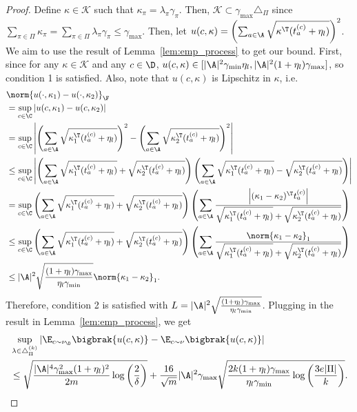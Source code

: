 \documentclass{article}
\newcommand{\mc}[1]{\mathcal{#1}}
\newcommand{\1}{\mathbf{1}}
\begin{document}
\begin{proof}
Define $\kappa\in\mc{K}$ such that $\kappa_\pi=\lambda_\pi\gamma_\pi$. Then, $\mc{K}\subset \gamma_{\max}\triangle_\Pi$ since $\sum_{\pi\in\Pi}\kappa_\pi=\sum_{\pi\in\Pi}\lambda_\pi\gamma_\pi\leq \gamma_{\max}$. Then, let $u(c,\kappa)=\left(\sum_{a\in\A} \sqrt{\kappa^\T (t_{a}^{(c)}+\eta_l)}\right)^2$. We aim to use the result of Lemma~\ref{lem:emp_process} to get our bound. First, since for any $\kappa\in\mc{K}$ and any $c\in\D$, $u(c,\kappa)\in [|\A|^2\gamma_{\min}\eta_l, |\A|^2(1+\eta_l)\gamma_{\max}]$, so condition 1 is satisfied. Also, note that $u(c,\kappa)$ is Lipschitz in $\kappa$, i.e. 
\begin{align*}
    &\norm{u(\cdot,\kappa_1)-u(\cdot,\kappa_2)}_\F\\
    &= \sup_{c\in\C}\left|u(c,\kappa_1)-u(c,\kappa_2)\right|\\
    &= \sup_{c\in\C}\left|\left(\sum_{a\in\A} \sqrt{\kappa_1^\T (t_{a}^{(c)}+\eta_l)}\right)^2-\left(\sum_{a\in\A} \sqrt{\kappa_2^\T (t_{a}^{(c)}+\eta_l)}\right)^2\right|\\
    &\leq \sup_{c\in\C} \left|\left(\sum_{a\in\A} \sqrt{\kappa_1^\T (t_a^{(c)}+\eta_l)}+\sqrt{\kappa_2^\T (t_a^{(c)}+\eta_l)}\right)\left(\sum_{a\in\A} \sqrt{\kappa_1^\T (t_a^{(c)}+\eta_l)}-\sqrt{\kappa_2^\T (t_a^{(c)}+\eta_l)}\right)\right|\\
    &= \sup_{c\in\C} \left(\sum_{a\in\A} \sqrt{\kappa_1^\T (t_a^{(c)}+\eta_l)}+\sqrt{\kappa_2^\T (t_a^{(c)}+\eta_l)}\right)\left(\sum_{a\in\A}\frac{\left|(\kappa_1-\kappa_2)^\T t_a^{(c)}\right|}{\sqrt{\kappa_1^\T (t_a^{(c)}+\eta_l)}+\sqrt{\kappa_2^\T (t_a^{(c)}+\eta_l)}}\right)\\
    &\leq \sup_{c\in\C} \left(\sum_{a\in\A} \sqrt{\kappa_1^\T (t_a^{(c)}+\eta_l)}+\sqrt{\kappa_2^\T (t_a^{(c)}+\eta_l)}\right)\left(\sum_{a\in\A}\frac{\norm{\kappa_1-\kappa_2}_1}{\sqrt{\kappa_1^\T (t_a^{(c)}+\eta_l)}+\sqrt{\kappa_2^\T (t_a^{(c)}+\eta_l)}}\right)\\
    &\leq |\A|^2\sqrt{\frac{(1+\eta_l)\gamma_{\max}}{\eta_l\gamma_{\min}}}\norm{\kappa_1-\kappa_2}_1.
\end{align*}
Therefore, condition 2 is satisfied with $L=|\A|^2\sqrt{\frac{(1+\eta_l)\gamma_{\max}}{\eta_l\gamma_{\min}}}$. Plugging in the result in Lemma~\ref{lem:emp_process}, we get  
\begin{align*}
    &\sup_{\lambda\in\triangle_\Pi^{(k)}}\left|\E_{c\sim\nu_\D}\bigbrak{u(c,\kappa)}-\E_{c\sim\nu}\bigbrak{u(c,\kappa)}\right|\\
    &\leq \sqrt{\frac{|\A|^4\gamma_{\max}^2(1+\eta_l)^2}{2m}\log\left(\frac{2}{\delta}\right)}+\frac{16}{\sqrt{m}}|\A|^2\gamma_{\max}\sqrt{\frac{2k(1+\eta_l)\gamma_{\max}}{\eta_l\gamma_{\min}}\log\left(\frac{3e|\Pi|}{k}\right)}. 
\end{align*}
\end{proof}
\end{document}
